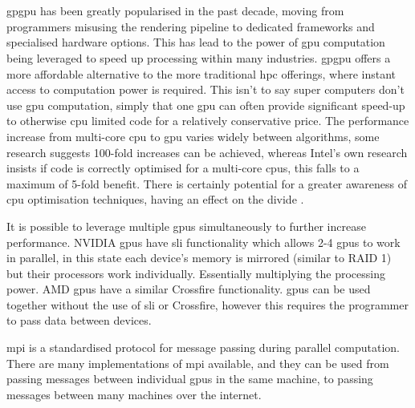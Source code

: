 \section{\label{sec:gpgpu}}
    \gls{gpgpu} has been greatly popularised in the past decade, moving from programmers misusing the rendering pipeline to dedicated frameworks and specialised hardware options. This has lead to the power of \gls{gpu} computation being leveraged to speed up processing within many industries. \gls{gpgpu} offers a more affordable alternative to the more traditional \gls{hpc} offerings, where instant access to computation power is required. This isn't to say super computers don't use \gls{gpu} computation, simply that one \gls{gpu} can often provide significant speed-up to otherwise \gls{cpu} limited code for a relatively conservative price. The performance increase from multi-core \gls{cpu} to \gls{gpu} varies widely between algorithms, some research suggests 100-fold increases can be achieved, whereas Intel's own research insists if code is correctly optimised for a multi-core \glspl{cpu}, this falls to a maximum of 5-fold benefit. There is certainly potential for a greater awareness of \gls{cpu} optimisation techniques, having an effect on the divide \cite{LK*10}.

    It is possible to leverage multiple \glspl{gpu} simultaneously to further increase performance. NVIDIA \glspl{gpu} have \gls{sli} functionality which allows 2-4 \glspl{gpu} to work in parallel, in this state each device's memory is mirrored (similar to RAID 1) but their processors work individually. Essentially multiplying the processing power. AMD \glspl{gpu} have a similar Crossfire functionality. \glspl{gpu} can be used together without the use of \gls{sli} or Crossfire, however this requires the programmer to pass data between devices. 
    
    \gls{mpi} is a standardised protocol for message passing during parallel computation. There are many implementations of \gls{mpi} available, and they can be used from passing messages between individual \glspl{gpu} in the same machine, to passing messages between many machines over the internet.
